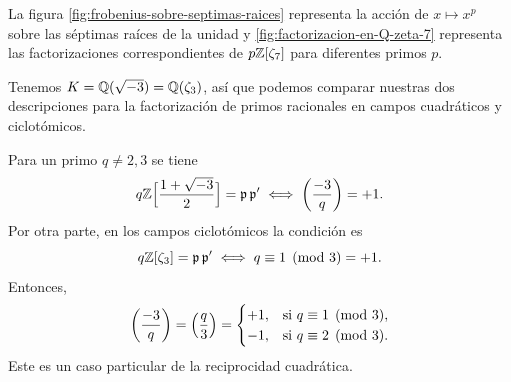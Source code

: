 \begin{ejemplo}
  La figura \ref{fig:frobenius-sobre-septimas-raices} representa la acción
  de $x \mapsto x^p$ sobre las séptimas raíces de la unidad y
  \ref{fig:factorizacion-en-Q-zeta-7} representa las factorizaciones
  correspondientes de $p \mathbb{Z} [\zeta_7]$ para diferentes primos $p$.
\end{ejemplo}

\begin{ejemplo}
  Tenemos $K = \mathbb{Q} (\sqrt{-3}) = \mathbb{Q} (\zeta_3)$, así que podemos comparar
  nuestras dos descripciones para la factorización de primos racionales en
  campos cuadráticos y ciclotómicos.

  Para un primo $q \ne 2,3$ se tiene
  \[ q \mathbb{Z} \Bigl[\frac{1+\sqrt{-3}}{2}\Bigr] = \mathfrak{p}\,\mathfrak{p}'
     \iff \left(\frac{-3}{q}\right) = +1. \]
  Por otra parte, en los campos ciclotómicos la condición es
  $$q \mathbb{Z} [\zeta_3] = \mathfrak{p}\,\mathfrak{p}' \iff q \equiv 1 \pmod{3} = +1.$$
  Entonces,
  \[ \left(\frac{-3}{q}\right) = \left(\frac{q}{3}\right) = \begin{cases}
    +1, & \text{si }q\equiv 1 \pmod{3},\\
    -1, & \text{si }q\equiv 2 \pmod{3}.
  \end{cases} \]
  Este es un caso particular de la reciprocidad cuadrática.
\end{ejemplo}

